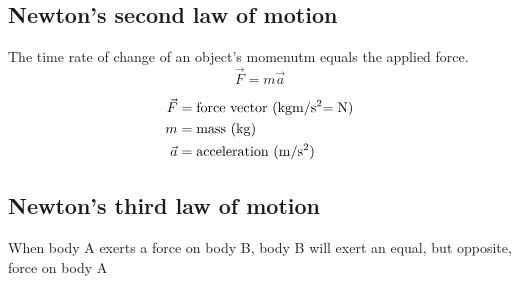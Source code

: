 \documentclass{article}
\begin{document}
\subsection{Newton's second law of motion}
\begin{multicols}{2}
	The time rate of change of an object's momenutm equals the applied force.
	\vfill\null
	\columnbreak
	\begin{equation*}
	\boxed{\vec{F} = m\vec{a}}
	\end{equation*}
	
	\begin{align*}
	\vec{F} &= \text{force vector (\si{\kilo\gram\meter\per\second\squared = \newton})}\\
	m &= \text{mass (\si{\kilo\gram})}\\
	\vec{a} &= \text{acceleration  (\si{\meter\per\second\squared})}\\
	\end{align*}
	
\end{multicols}

\subsection{Newton's third law of motion}
When body A exerts a force on body B, body B will exert an equal, but opposite, force on body A
\end{document}
